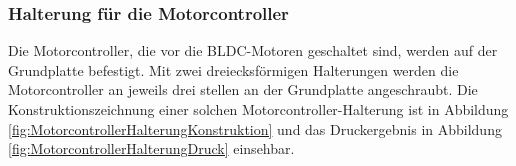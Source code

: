 \subsubsection{Halterung für die Motorcontroller}\label{Sec2Sub2SubSub4}

Die Motorcontroller, die vor die BLDC-Motoren geschaltet sind, werden auf der Grundplatte befestigt. Mit zwei dreiecksförmigen Halterungen werden die Motorcontroller an jeweils drei stellen an der Grundplatte angeschraubt. Die Konstruktionszeichnung einer solchen Motorcontroller-Halterung ist in Abbildung \ref{fig:MotorcontrollerHalterungKonstruktion} und das Druckergebnis in Abbildung \ref{fig:MotorcontrollerHalterungDruck} einsehbar.

